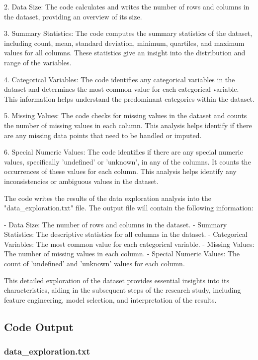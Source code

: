 \documentclass[11pt]{article}
\begin{document}
2. Data Size:
   The code calculates and writes the number of rows and columns in the dataset, providing an overview of its size.

3. Summary Statistics:
   The code computes the summary statistics of the dataset, including count, mean, standard deviation, minimum, quartiles, and maximum values for all columns. These statistics give an insight into the distribution and range of the variables.

4. Categorical Variables:
   The code identifies any categorical variables in the dataset and determines the most common value for each categorical variable. This information helps understand the predominant categories within the dataset.

5. Missing Values:
   The code checks for missing values in the dataset and counts the number of missing values in each column. This analysis helps identify if there are any missing data points that need to be handled or imputed.

6. Special Numeric Values:
   The code identifies if there are any special numeric values, specifically 'undefined' or 'unknown', in any of the columns. It counts the occurrences of these values for each column. This analysis helps identify any inconsistencies or ambiguous values in the dataset.

The code writes the results of the data exploration analysis into the "data\_exploration.txt" file. The output file will contain the following information:

- Data Size: The number of rows and columns in the dataset.
- Summary Statistics: The descriptive statistics for all columns in the dataset.
- Categorical Variables: The most common value for each categorical variable.
- Missing Values: The number of missing values in each column.
- Special Numeric Values: The count of 'undefined' and 'unknown' values for each column.

This detailed exploration of the dataset provides essential insights into its characteristics, aiding in the subsequent steps of the research study, including feature engineering, model selection, and interpretation of the results.

\subsection{Code Output}

\subsubsection*{data\_exploration.txt}
\end{document}
